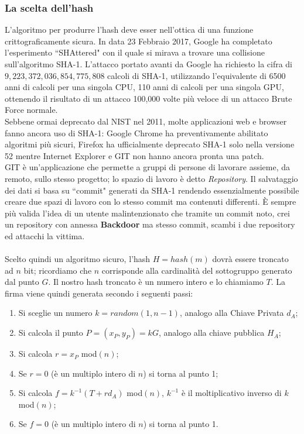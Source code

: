 \documentclass[a4paper,12pt]{tesiinfo}
\begin{document}
\subsubsection{La scelta dell'hash}
L'algoritmo per produrre l'hash deve esser nell'ottica di una funzione crittograficamente sicura. In data 23 Febbraio 2017, Google ha completato l'esperimento ``SHAttered" con il quale si mirava a trovare una collisione sull'algoritmo SHA-1. L'attacco portato avanti da Google ha richiesto la cifra di $9,223,372,036,854,775,808$ calcoli di SHA-1, utilizzando l'equivalente di 6500 anni di calcoli per una singola CPU, 110 anni di calcoli per una singola GPU, ottenendo il risultato di un attacco 100,000 volte pi\`u veloce di un attacco Brute Force normale.
\\
Sebbene ormai deprecato dal NIST nel 2011, molte applicazioni web e browser fanno ancora uso di SHA-1: Google Chrome ha preventivamente abilitato algoritmi pi\`u sicuri, Firefox ha ufficialmente deprecato SHA-1 solo nella versione 52 mentre Internet Explorer e GIT non hanno ancora pronta una patch. \\
GIT \`e un'applicazione che permette a gruppi di persone di lavorare assieme, da remoto, sullo stesso progetto; lo spazio di lavoro \`e detto \textit{Repository}. Il salvataggio dei dati si basa su ``commit" generati da SHA-1 rendendo essenzialmente possibile creare due spazi di lavoro con lo stesso commit ma contenuti differenti. \`E sempre pi\`u valida l'idea di un utente malintenzionato che tramite un commit noto, crei un repository con annessa \textbf{Backdoor} ma stesso commit, scambi i due repository ed attacchi la vittima.
\\
\\
Scelto quindi un algoritmo sicuro, l'hash $H = hash(m)$ dovr\`a essere troncato ad $n$ bit; ricordiamo che $n$ corrisponde alla cardinalit\`a del sottogruppo generato dal punto $G$. Il nostro hash troncato \`e un numero intero e lo chiamiamo $T$. La firma viene quindi generata secondo i seguenti passi:
\begin{enumerate}
 \item Si sceglie un numero $k = random(1, n-1)$, analogo alla Chiave Privata $d_A$;
 \item Si calcola il punto $P = (x_P, y_P) = kG$, analogo alla chiave pubblica $H_A$;
 \item Si calcola $r = x_P $ mod$(n)$;
 \item Se $r = 0$ (\`e un multiplo intero di $n$) si torna al punto 1;
 \item Si calcola $f = k^{-1} (T+rd_A) $ mod$(n)$, $k^{-1}$ \`e il moltiplicativo inverso di $k$ mod$(n)$;
 \item Se $f = 0$ (\`e un multiplo intero di $n$) si torna al punto 1.
\end{enumerate}
\end{document}
